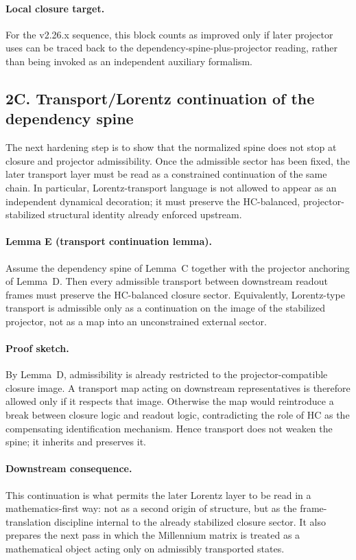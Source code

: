 \documentclass[12pt,a4paper]{article}
\begin{document}
\paragraph{Local closure target.}
For the v2.26.x sequence, this block counts as improved only if later projector
uses can be traced back to the dependency-spine-plus-projector reading, rather
than being invoked as an independent auxiliary formalism.

\subsection*{2C. Transport/Lorentz continuation of the dependency spine}
The next hardening step is to show that the normalized spine does not stop at
closure and projector admissibility. Once the admissible sector has been fixed,
the later transport layer must be read as a constrained continuation of the same
chain. In particular, Lorentz-transport language is not allowed to appear as an
independent dynamical decoration; it must preserve the HC-balanced,
projector-stabilized structural identity already enforced upstream.

\paragraph{Lemma E (transport continuation lemma).}
Assume the dependency spine of Lemma~C together with the projector anchoring of
Lemma~D. Then every admissible transport between downstream readout frames must
preserve the HC-balanced closure sector. Equivalently, Lorentz-type transport is
admissible only as a continuation on the image of the stabilized projector, not
as a map into an unconstrained external sector.

\paragraph{Proof sketch.}
By Lemma~D, admissibility is already restricted to the projector-compatible
closure image. A transport map acting on downstream representatives is therefore
allowed only if it respects that image. Otherwise the map would reintroduce a
break between closure logic and readout logic, contradicting the role of HC as
the compensating identification mechanism. Hence transport does not weaken the
spine; it inherits and preserves it.

\paragraph{Downstream consequence.}
This continuation is what permits the later Lorentz layer to be read in a
mathematics-first way: not as a second origin of structure, but as the
frame-translation discipline internal to the already stabilized closure sector.
It also prepares the next pass in which the Millennium matrix is treated as a
mathematical object acting only on admissibly transported states.
\end{document}
